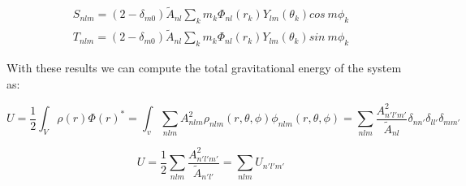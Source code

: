 \documentclass[14pt]{article}
\begin{document}
\begin{equation}
  \begin{aligned}
    S_{nlm} = (2-\delta_{m0})\tilde{A}_{nl} \sum_k m_k
  \Phi_{nl}(r_k)Y_{lm}(\theta_k) cos\ m\phi_k \\
    T_{nlm} = (2-\delta_{m0})\tilde{A}_{nl} \sum_k m_k 
  \Phi_{nl}(r_k)Y_{lm}(\theta_k) sin\ m\phi_k 
  \end{aligned}
\end{equation}


With these results we can compute the total gravitational energy of the system
as:

\begin{equation}
  U = \dfrac{1}{2} \int_V \rho(r)\Phi(r)^{*} = \int_v  \sum_{nlm} A_{nlm}^2 \rho_{nlm}(r,
  \theta, \phi) \phi_{nlm}(r, \theta, \phi) = \sum_{nlm}
  \frac{A_{n'l'm'}^2}{\tilde{A}_{nl}}
  \delta_{nn'}\delta_{ll'}\delta_{mm'} 
\end{equation}

\begin{equation}
  U = \dfrac{1}{2}\sum_{nlm} \frac{A_{n'l'm'}^2}{\tilde{A}_{n'l'}} = \sum_{nlm} U_{n'l'm'}
\end{equation}
\end{document}
